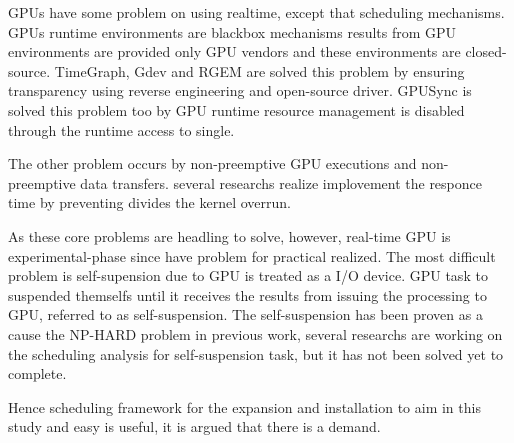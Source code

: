 GPUs have some problem on using realtime, except that scheduling mechanisms.
GPUs runtime environments are blackbox mechanisms results from GPU environments are provided only GPU vendors and these environments are closed-source.
TimeGraph, Gdev and RGEM are solved this problem by ensuring transparency using reverse engineering and open-source driver.
GPUSync is solved this problem too by GPU runtime resource management is disabled through the runtime access to single.

The other problem occurs by non-preemptive GPU executions and non-preemptive data transfers.
several researchs\cite{} realize implovement the responce time by preventing divides the kernel overrun.

As these core problems are headling to solve, however, real-time GPU is experimental-phase since have problem for practical realized.
The most difficult problem is self-supension due to GPU is treated as a I/O device.
GPU task to suspended themselfs until it receives the results from issuing the processing to GPU, referred to as self-suspension.
The self-suspension has been proven as a cause the NP-HARD problem in previous work\cite{self-sus:1,self-sus:2},
several researchs\cite{chattopadhyay2014limited, kim2013segment} are working on the scheduling analysis for self-suspension task, but it has not been solved yet to complete.

Hence scheduling framework for the expansion and installation to aim in this study and easy is useful,
it is argued that there is a demand.

